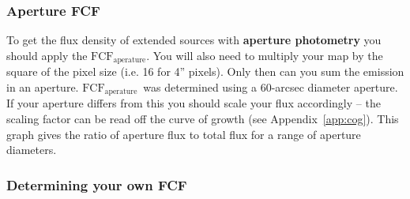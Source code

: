 \documentclass[twoside,11pt]{article}
\newcommand{\htmlref}[2]{#1}
\newcommand{\latexhtml}[2]{#1}
\renewcommand{\_}{\texttt{\symbol{95}}}
\newcommand{\fcfa}{$\mathrm{FCF_{aperature}}$}
\newcommand{\cref}[3]{\latexhtml{#1~\ref{#2}}{\htmlref{#3}{#2}}}
\begin{document}
\subsubsection{Aperture FCF}

To get the flux density of extended sources with \textbf{aperture
photometry} you should apply the \fcfa. You will also need to multiply
your map by the square of the pixel size (i.e. 16 for 4'' pixels).
Only then can you sum the emission in an aperture. \fcfa\ was
determined using a 60-arcsec diameter aperture. If your aperture
differs from this you should scale your flux accordingly -- the
scaling factor can be read off the curve of growth (see
\cref{Appendix}{app:cog}{this appendix}). This graph gives the ratio
of aperture flux to total flux for a range of aperture diameters.

\subsubsection{Determining your own FCF}
\end{document}
